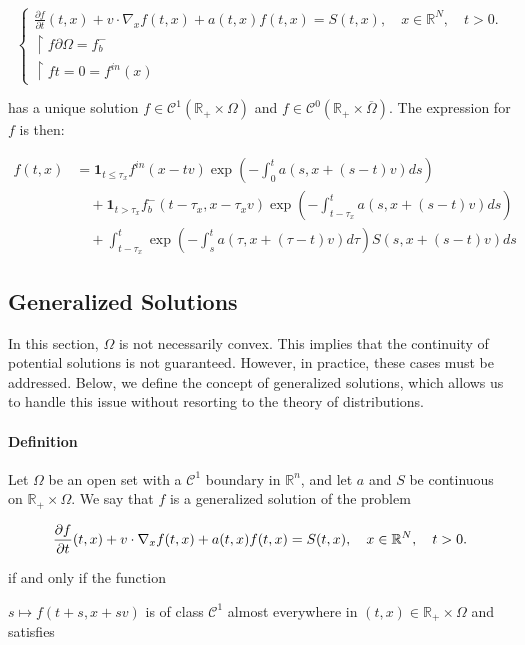 \documentclass[onecolumn, 12pt, a4paper]{article}
\begin{document}
\[
\begin{cases}
\frac{\partial f}{\partial t}(t,x)+v \cdot \nabla_x f(t,x)+ a(t,x)f(t,x)=S(t,x), \quad x \in \mathbb{R}^N, \quad t>0.\\
\restriction{f}{\partial \Omega}= f_b^-\\
\restriction{f}{t=0}= f^{in}(x)
\end{cases}
\]

has a unique solution $f \in \mathcal{C}^1(\mathbb{R}_+ \times \Omega)$ and $f \in \mathcal{C}^0(\mathbb{R}_+ \times \overline{\Omega})$. The expression for $f$ is then:


\[
\boxed{
\begin{aligned}
f(t,x) &= \mathbf{1}_{t \leq \tau_x} f^{in} (x-tv) \exp\left(-\int_0^t a(s,x+(s-t)v)ds\right) \\
&\quad + \mathbf{1}_{t > \tau_x} f_b^- (t-\tau_x,x-\tau_x v) \exp\left(-\int_{t-\tau_x}^t a(s,x+(s-t)v)ds\right) \\
&\quad + \int_{t-\tau_x}^t \exp\left(-\int_{s}^{t}a(\tau,x+(\tau-t)v)d\tau\right) S(s,x+(s-t)v)ds
\end{aligned}}
\]


\subsection{Generalized Solutions}

In this section, $\Omega$ is not necessarily convex. This implies that the continuity of potential solutions is not guaranteed. However, in practice, these cases must be addressed. Below, we define the concept of generalized solutions, which allows us to handle this issue without resorting to the theory of distributions.


\paragraph{Definition}

Let $\Omega$ be an open set with a $\mathcal{C}^1$ boundary in $\mathbb{R}^n$, and let $a$ and $S$ be continuous on $\mathbb{R}_+ \times \Omega$. We say that $f$ is a generalized solution of the problem

$$\frac{\partial f}{\partial t}(t,x)+v \cdot \nabla_x f(t,x)+ a(t,x)f(t,x)=S(t,x), \quad x \in \mathbb{R}^N, \quad t>0.\\$$

if and only if the function

$s \mapsto f(t+s,x+sv)$ is of class $\mathcal{C}^1$ almost everywhere in $(t,x) \in \mathbb{R}_+ \times \Omega$ and satisfies
\end{document}
